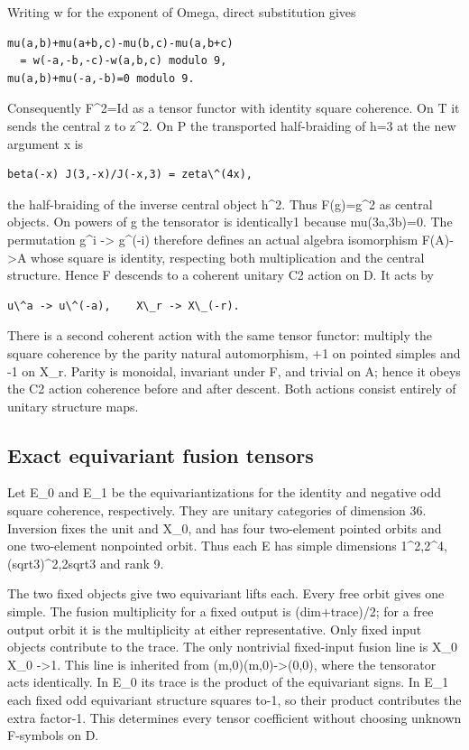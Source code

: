 Writing w for the exponent of Omega, direct substitution gives

\begin{verbatim}
mu(a,b)+mu(a+b,c)-mu(b,c)-mu(a,b+c)
  = w(-a,-b,-c)-w(a,b,c) modulo 9,
mu(a,b)+mu(-a,-b)=0 modulo 9.
\end{verbatim}

Consequently F\^{}2=Id as a tensor functor with identity square
coherence. On T it sends the central z to z\^{}2. On P the transported
half-braiding of h=3 at the new argument x is

\begin{verbatim}
beta(-x) J(3,-x)/J(-x,3) = zeta\^(4x),
\end{verbatim}

the half-braiding of the inverse central object h\^{}2. Thus F(g)=g\^{}2
as central objects. On powers of g the tensorator is identically1
because mu(3a,3b)=0. The permutation g\^{}i -\textgreater{} g\^{}(-i)
therefore defines an actual algebra isomorphism F(A)-\textgreater A
whose square is identity, respecting both multiplication and the central
structure. Hence F descends to a coherent unitary C2 action on D. It
acts by

\begin{verbatim}
u\^a -> u\^(-a),    X\_r -> X\_(-r).
\end{verbatim}

There is a second coherent action with the same tensor functor: multiply
the square coherence by the parity natural automorphism, +1 on pointed
simples and -1 on X\_r. Parity is monoidal, invariant under F, and
trivial on A; hence it obeys the C2 action coherence before and after
descent. Both actions consist entirely of unitary structure maps.

\hypertarget{exact-equivariant-fusion-tensors}{%
\subsection{Exact equivariant fusion
tensors}\label{exact-equivariant-fusion-tensors}}

Let E\_0 and E\_1 be the equivariantizations for the identity and
negative odd square coherence, respectively. They are unitary categories
of dimension 36. Inversion fixes the unit and X\_0, and has four
two-element pointed orbits and one two-element nonpointed orbit. Thus
each E has simple dimensions 1\^{}2,2\^{}4,(sqrt3)\^{}2,2sqrt3 and rank
9.

The two fixed objects give two equivariant lifts each. Every free orbit
gives one simple. The fusion multiplicity for a fixed output is
(dim+trace)/2; for a free output orbit it is the multiplicity at either
representative. Only fixed input objects contribute to the trace. The
only nontrivial fixed-input fusion line is X\_0 X\_0 -\textgreater1.
This line is inherited from (m,0)(m,0)-\textgreater(0,0), where the
tensorator acts identically. In E\_0 its trace is the product of the
equivariant signs. In E\_1 each fixed odd equivariant structure squares
to-1, so their product contributes the extra factor-1. This determines
every tensor coefficient without choosing unknown F-symbols on D.

